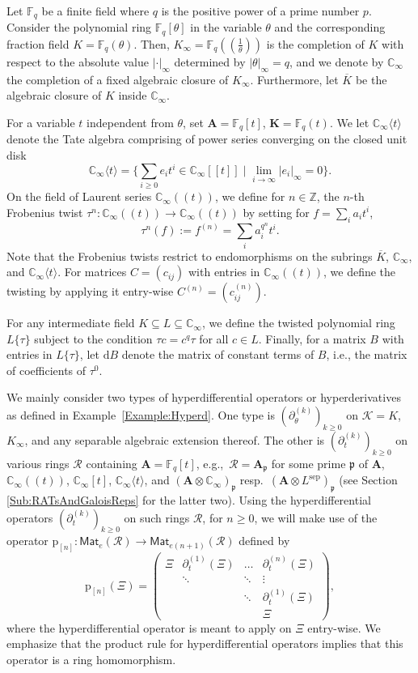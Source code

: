 \documentclass[10pt,a4paper]{amsart}
\theoremstyle{plain} %
\theoremstyle{definition}
\theoremstyle{remark}
\newcommand{\CC}{\mathbb{C}}
\newcommand{\FF}{\mathbb{F}}
\newcommand{\ZZ}{\mathbb{Z}}  %
\newcommand{\cK}{\mathcal{K}}   %
\newcommand{\cR}{\mathcal{R}}
\newcommand{\fp}{\mathfrak{p}}  %
\newcommand{\bA}{\mathbf{A}}
\newcommand{\bK}{\mathbf{K}}
\newcommand{\rd}{\mathrm{d}}
\newcommand{\oK}{\overline{K}}
\newcommand{\Fq}{\FF_{\!q}}  %
\newcommand{\Mat}{\mathsf{Mat}}
\newcommand{\KI}{\mathbb{K}_{\infty}}  %
\newcommand{\CI}{\CC_{\infty}}  %
\newcommand{\ls}[1]{(\!(#1)\!)}%
\newcommand{\cs}[1]{\langle #1 \rangle} %
\newcommand{\sep}{\mathrm{sep}}
\newcommand{\hde}[1]{\partial^{(#1)}}  %
\newcommand{\hdt}[2]{\partial_t^{(#1)}\!\!\left(#2\right)} %
\newcommand{\hdte}[1]{\partial_t^{(#1)}}  %
\newcommand{\prol}[1]{\mathrm{p}_{[#1]}}
\numberwithin{equation}{subsection}
\begin{document}
Let $\Fq$ be a finite field where $q$ is the positive power of a prime number $p$. Consider the polynomial ring $\Fq[\theta]$ in the variable $\theta$ and the corresponding fraction field $K=\Fq(\theta)$. Then,  $K_\infty=\Fq\ls{\frac{1}{\theta}}$ is the completion of $K$ with respect to the absolute value $\lvert \cdot \rvert_\infty$ determined by $\lvert \theta \rvert_\infty=q$, and we denote by $\CC_\infty$ the completion of a fixed  algebraic closure of $K_\infty$. Furthermore, let $\oK$ be the algebraic closure of $K$ inside $\CC_{\infty}$. 






For a variable $t$ independent from $\theta$, set $\bA=\Fq[t]$, $\bK=\Fq(t)$. 
We let $\CC_\infty \langle t \rangle$ denote the Tate algebra comprising of power series converging on the closed unit disk  
\[
\CC_\infty \langle t \rangle = \bigg\{ \sum_{i \geq 0} e_it^i \in \CC_\infty [\![t]\!] \mid \lim_{i \rightarrow \infty} |e_i|_\infty =0\bigg\}.
\]
On the field of Laurent series $\CI\ls{t}$, we define for $n\in\ZZ$, the $n$-th Frobenius twist $\tau^n: \CI\ls{t} \rightarrow \CI\ls{t}$ by setting for $f = \sum_i a_it^i$,
\[
\tau^n ( f) := f^{(n)} = \sum_i a_i^{q^n}t^i.
\]
Note that the Frobenius twists restrict to endomorphisms on  the subrings $\oK$, $\CI$, and $\CI\cs{t}$.
For matrices $C=(c_{ij})$ with entries in $\CI\ls{t}$, we define the twisting by applying it entry-wise $C^{(n)} = (c_{ij}^{(n)})$.

For any intermediate field $K\subseteq L\subseteq \CI$, we define the twisted polynomial ring $L\{\tau\}$ 
subject to the condition $\tau c = c^q\tau$ for all $c \in L$. 
 Finally, for a matrix $B$ with entries in $L\{\tau\}$, let $\rd B$ denote the matrix  of constant terms of $B$, i.e., the matrix of coefficients of $\tau^0$.


\medskip

We mainly consider two types of hyperdifferential operators or hyperderivatives as defined in Example~\ref{Example:Hyperd}. One type is $(\hde{k}_\theta)_{k\geq 0}$ on $\cK=K$, $K_\infty$, and any separable algebraic extension thereof. The other is $(\hdte{k})_{k\geq 0}$ on various rings $\cR$ containing $\bA=\Fq[t]$, e.g.,~$\cR=\bA_\fp$ for some prime $\fp$ of $\bA$, $\CI\ls{t}$, $\CI[t]$, $\CI\cs{t}$, and $(\bA\otimes \CI)_\fp$ resp.~$(\bA\otimes L^\sep)_\fp$ (see Section \ref{Sub:RATsAndGaloisReps} for the latter two).
Using the hyperdifferential operators $(\hdte{k})_{k\geq 0}$
on such rings $\cR$, for $n \geq 0$, we will make use of the operator $\prol{n}:\Mat_{e}(\cR) \rightarrow \Mat_{e(n+1)}(\cR)$ defined by 
\[
\prol{n}(\Xi) = \begin{pmatrix}
			\Xi & \hdt{1}{\Xi} & \dots& \hdt{n}{\Xi} \\
			&    \ddots     & \ddots&\vdots\\
			&&\ddots&\hdt{1}{\Xi}\\
			&&&\Xi
		\end{pmatrix},
\]
where the hyperdifferential operator is meant to apply on $\Xi$ entry-wise.
We emphasize that the product rule for hyperdifferential operators implies that this operator is a ring homomorphism. 
\end{document}
